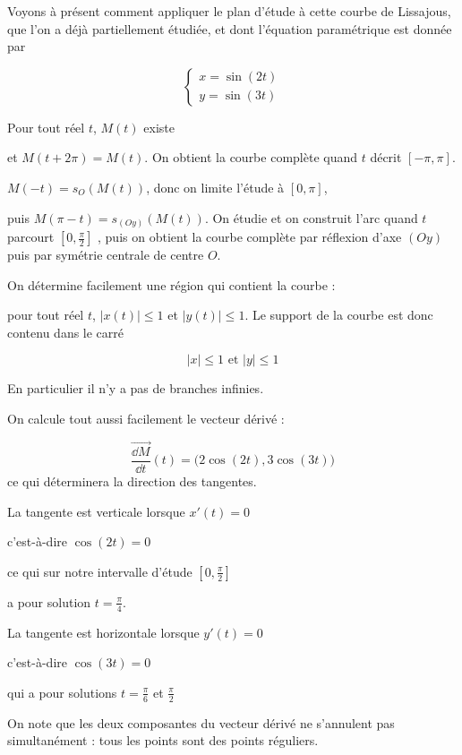 \diapo

Voyons à présent comment appliquer le plan d'étude 
à cette courbe de Lissajous, que l'on a déjà partiellement étudiée,
et dont l'équation 
paramétrique est donnée par 

$$\left\{
\begin{array}{l}
x=\sin(2t)\\
y=\sin(3t)
\end{array}
\right.$$

\change
  Pour tout réel $t$, $M(t)$ existe 
  
\change
  et $M(t+2\pi)=M(t)$. 
On obtient la courbe complète quand $t$ décrit $[-\pi,\pi]$.

\change
 $M(-t)=s_O(M(t))$, donc on limite l'étude à $[0,\pi]$, 
 
\change
puis $M(\pi-t)=s_{(Oy)}(M(t))$. On étudie et on construit l'arc
quand $t$ parcourt $[0,\frac{\pi}{2}]$
, puis on obtient la courbe 
complète par réflexion d'axe $(Oy)$ 
puis par symétrie centrale de centre
$O$. 

\change
On détermine facilement une région qui contient la courbe :

\change
pour tout réel $t$, $|x(t)|\leq1$ et $|y(t)|\leq1$. 
Le support de la courbe est donc contenu dans le carré 

$$|x|\leq1 \text{ et }|y|\leq1$$

En particulier il n'y a pas de branches infinies.


\change
On calcule tout aussi facilement le vecteur dérivé :

\change
$$\overrightarrow{\frac{\dd M}{\dd t}}(t)
=\big(2\cos(2t),3\cos(3t)\big)$$
ce qui déterminera la direction des tangentes.



\change
La tangente est verticale lorsque
$x'(t)=0$ 

c'est-à-dire 
$\cos(2t)=0$

ce qui sur notre intervalle d'étude $[0,\frac{\pi}{2}]$

a pour solution $t=\tfrac{\pi}{4}$.

\change
La tangente est horizontale lorsque
$y'(t)=0$ 

c'est-à-dire 
$\cos(3t)=0$

qui a pour solutions $t = \tfrac{\pi}{6}$ et $\tfrac{\pi}{2}$

On note que les deux composantes du vecteur dérivé 
ne s'annulent pas simultanément : tous les points sont des points 
réguliers.


